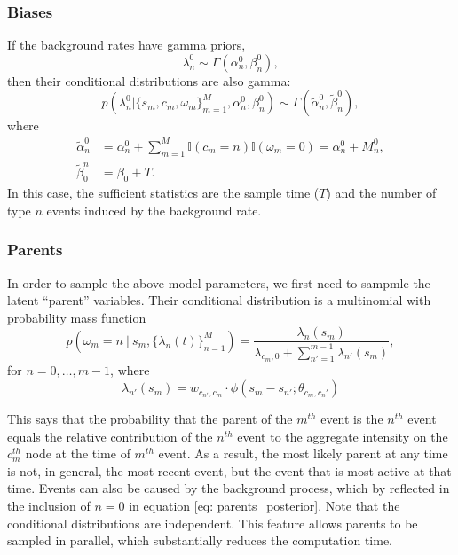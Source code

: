		\subsubsection*{Biases}
			If the background rates have gamma priors,
			\begin{equation}
				\lambda_n^{0} \sim \Gamma(\alpha_n^0, \beta_n^0),
			\end{equation}
			then their conditional distributions are also gamma:
			\begin{equation}
				p(\lambda_n^{0} | \{s_m, c_m, \omega_m\}_{m=1}^M, \alpha_n^0, \beta_n^0) \sim \Gamma(\tilde{\alpha}_n^0, \tilde{\beta}_n^0),
			\end{equation}
			where
			\begin{align}
				\tilde{\alpha}_n^0 &= \alpha_n^0 + \sum_{m=1}^M \mathbb{I}(c_m=n) \mathbb{I}(\omega_m=0) = \alpha_n^0 + M_n^0, \\
				\tilde{\beta}_0^n &= \beta_0 + T.
			\end{align}
			In this case, the sufficient statistics are the sample time ($T$) and the number of type $n$ events induced by the background rate.

		\subsubsection*{Parents}
			In order to sample the above model parameters, we first need to sampmle the latent ``parent'' variables. Their conditional distribution is a multinomial with probability mass function
			\begin{equation} \label{eq: parents_posterior}
				p(\omega_m = n \ | \ s_m, \{ \lambda_n(t)\}_{n=1}^M) = \frac{\lambda_n(s_m)}{\lambda_{c_m, 0} + \sum_{n'=1}^{m - 1} \lambda_{n'}(s_m)},
			\end{equation}
			for $n = 0, \dots, m - 1$, where
			\begin{equation}
				\lambda_{n'}(s_m) = w_{c_{n'},c_m} \cdot \phi(s_m - s_{n'}; \theta_{c_m,c_n'})
			\end{equation}

			This says that the probability that the parent of the $m^{th}$ event is the $n^{th}$ event equals the relative contribution of the $n^{th}$ event to the aggregate intensity on the $c_m^{th}$ node at the time of $m^{th}$ event. As a result, the most likely parent at any time is not, in general, the most recent event, but the event that is most active at that time. Events can also be caused by the background process, which by reflected in the inclusion of $n=0$ in equation \eqref{eq: parents_posterior}. Note that the conditional distributions are independent. This feature allows parents to be sampled in parallel, which substantially reduces the computation time.

